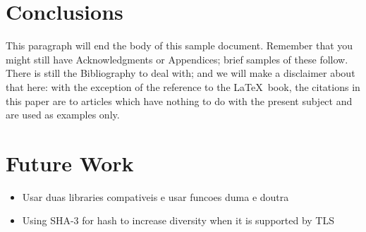 \documentclass{sig-alternate-05-2015}
\begin{document}
\section{Conclusions}
This paragraph will end the body of this sample document.
Remember that you might still have Acknowledgments or
Appendices; brief samples of these
follow.  There is still the Bibliography to deal with; and
we will make a disclaimer about that here: with the exception
of the reference to the \LaTeX\ book, the citations in
this paper are to articles which have nothing to
do with the present subject and are used as
examples only.


\section{Future Work}

\begin{itemize}
\item Usar duas libraries compativeis e usar funcoes duma e doutra
\item Using SHA-3 for hash to increase diversity when it is supported by TLS
\end{itemize}

%

%
%
\end{document}
